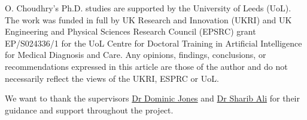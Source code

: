 \documentclass[sigconf, screen, review]{acmart}
\begin{document}

\maketitle









\begin{acks}
O. Choudhry's Ph.D. studies are supported by the University of Leeds (UoL). The work was funded in full by UK Research and Innovation (UKRI) and UK Engineering and Physical Sciences Research Council (EPSRC) grant EP/S024336/1 for the UoL Centre for Doctoral Training in Artificial Intelligence for Medical Diagnosis and Care. Any opinions, findings, conclusions, or recommendations expressed in this article are those of the author and do not necessarily reflect the views of the UKRI, ESPRC or UoL.

We want to thank the supervisors \href{mailto: D.P.Jones@leeds.ac.uk}{Dr Dominic Jones} and \href{mailto: S.S.Ali@leeds.ac.uk}{Dr Sharib Ali} for their guidance and support throughout the project.
\end{acks}
% 


\end{document}

